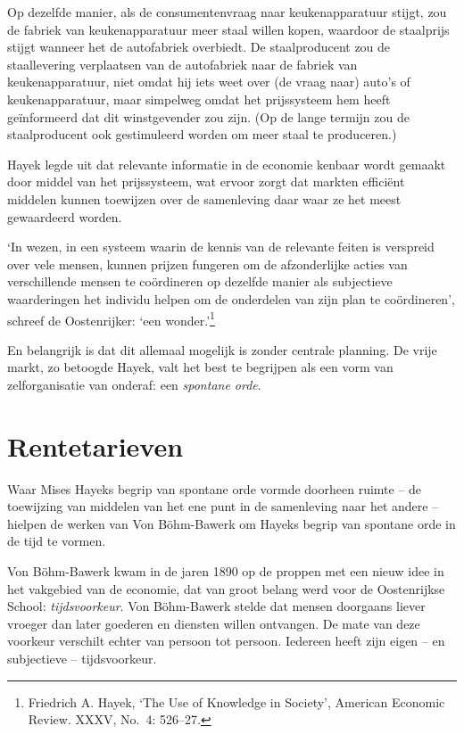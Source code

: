 \documentclass[smalldemyvopaper,11pt,twoside,onecolumn,openright,extrafontsizes,hidelinks]{memoir}
\begin{document}
Op dezelfde manier, als de consumentenvraag naar keukenapparatuur
stijgt, zou de fabriek van keukenapparatuur meer staal willen kopen,
waardoor de staalprijs stijgt wanneer het de autofabriek overbiedt. De
staalproducent zou de staallevering verplaatsen van de autofabriek naar
de fabriek van keukenapparatuur, niet omdat hij iets weet over (de vraag
naar) auto's of keukenapparatuur, maar simpelweg omdat het prijssysteem
hem heeft geïnformeerd dat dit winstgevender zou zijn. (Op de lange
termijn zou de staalproducent ook gestimuleerd worden om meer staal te
produceren.)

Hayek legde uit dat relevante informatie in de economie kenbaar wordt
gemaakt door middel van het prijssysteem, wat ervoor zorgt dat markten
efficiënt middelen kunnen toewijzen over de samenleving daar waar ze het
meest gewaardeerd worden.

`In wezen, in een systeem waarin de kennis van de relevante feiten is
verspreid over vele mensen, kunnen prijzen fungeren om de afzonderlijke
acties van verschillende mensen te coördineren op dezelfde manier als
subjectieve waarderingen het individu helpen om de onderdelen van zijn
plan te coördineren', schreef de Oostenrijker: `een wonder.'\footnote{Friedrich
  A. Hayek, `The Use of Knowledge in Society', American Economic Review.
  XXXV, No.~4: 526--27.}

En belangrijk is dat dit allemaal mogelijk is zonder centrale planning.
De vrije markt, zo betoogde Hayek, valt het best te begrijpen als een
vorm van zelforganisatie van onderaf: een \emph{spontane orde}.

\section{Rentetarieven}\label{rentetarieven}

Waar Mises Hayeks begrip van spontane orde vormde doorheen ruimte -- de
toewijzing van middelen van het ene punt in de samenleving naar het
andere -- hielpen de werken van Von Böhm-Bawerk om Hayeks begrip van
spontane orde in de tijd te vormen.

Von Böhm-Bawerk kwam in de jaren 1890 op de proppen met een nieuw idee
in het vakgebied van de economie, dat van groot belang werd voor de
Oostenrijkse School: \emph{tijdsvoorkeur}. Von Böhm-Bawerk stelde dat
mensen doorgaans liever vroeger dan later goederen en diensten willen
ontvangen. De mate van deze voorkeur verschilt echter van persoon tot
persoon. Iedereen heeft zijn eigen -- en subjectieve -- tijdsvoorkeur.
\end{document}
